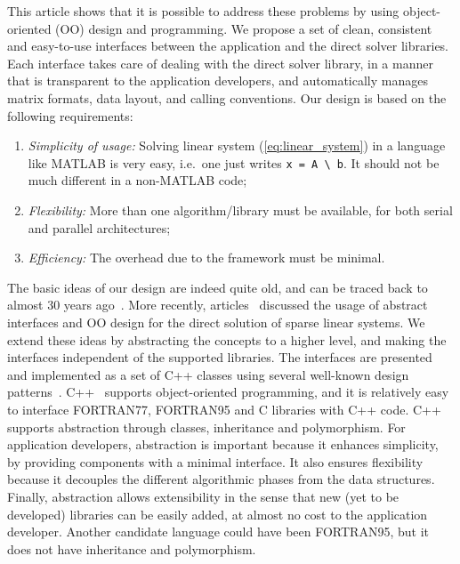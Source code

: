 \documentclass[acmtoms,acmnow]{acmtrans2m}
\begin{document}
This article shows that it is possible to address these problems by
using object-oriented (OO) design and programming.  We propose a set
of clean, consistent and easy-to-use interfaces between the
application and the direct solver libraries.  Each interface takes
care of dealing with the direct solver library, in a manner that is
transparent to the application developers, and automatically manages
matrix formats, data layout, and calling conventions. Our design is
based on the following requirements:
\begin{enumerate}

\item {\sl Simplicity of usage:} Solving linear system
(\ref{eq:linear_system}) in a language like MATLAB is very easy, i.e.~one just
writes \verb!x = A \ b!. It should not be much different in a non-MATLAB
code;

\item {\sl Flexibility:} More than one algorithm/library must be available,
  for both serial and parallel architectures;

\item {\sl Efficiency:} The overhead due to the framework must be minimal.
\end{enumerate}

The basic ideas of our design are indeed quite old, and can be traced back to
almost 30 years ago~\cite{duff79performance,george79design}. More recently,
  articles~\cite{george99object,dobrian99design} discussed the usage of
  abstract interfaces and OO design for the direct solution of sparse linear
  systems.  We extend these ideas by abstracting the concepts to
a higher level, and making the interfaces independent of the
supported libraries. The interfaces are presented and implemented as
a set of C++ classes using several well-known design
patterns~\cite{Gamma}. C++~\cite{cppbook} supports object-oriented
programming, and it is relatively easy to interface FORTRAN77,
FORTRAN95 and C libraries with C++ code. C++ supports abstraction
through classes, inheritance and polymorphism. For application
developers, abstraction is important because it enhances simplicity,
by providing components with a minimal interface. It also ensures
flexibility because it decouples the different algorithmic phases
from the data structures. Finally, abstraction allows extensibility
in the sense that new (yet to be developed) libraries can be easily
added, at almost no cost to the application developer. Another
candidate language could have been FORTRAN95, but it does not have
inheritance and polymorphism.
\end{document}
